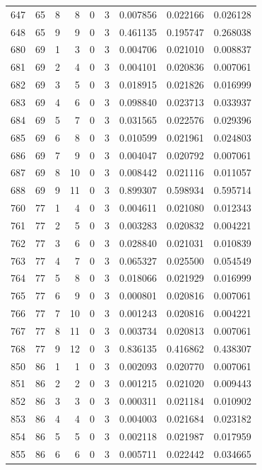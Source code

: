 \begin{longtable}{rrrrrrrrr}
647 & 65 & 8 & 8 & 0 & 3 & 0.007856 & 0.022166 & 0.026128 \\
648 & 65 & 9 & 9 & 0 & 3 & 0.461135 & 0.195747 & 0.268038 \\
680 & 69 & 1 & 3 & 0 & 3 & 0.004706 & 0.021010 & 0.008837 \\
681 & 69 & 2 & 4 & 0 & 3 & 0.004101 & 0.020836 & 0.007061 \\
682 & 69 & 3 & 5 & 0 & 3 & 0.018915 & 0.021826 & 0.016999 \\
683 & 69 & 4 & 6 & 0 & 3 & 0.098840 & 0.023713 & 0.033937 \\
684 & 69 & 5 & 7 & 0 & 3 & 0.031565 & 0.022576 & 0.029396 \\
685 & 69 & 6 & 8 & 0 & 3 & 0.010599 & 0.021961 & 0.024803 \\
686 & 69 & 7 & 9 & 0 & 3 & 0.004047 & 0.020792 & 0.007061 \\
687 & 69 & 8 & 10 & 0 & 3 & 0.008442 & 0.021116 & 0.011057 \\
688 & 69 & 9 & 11 & 0 & 3 & 0.899307 & 0.598934 & 0.595714 \\
760 & 77 & 1 & 4 & 0 & 3 & 0.004611 & 0.021080 & 0.012343 \\
761 & 77 & 2 & 5 & 0 & 3 & 0.003283 & 0.020832 & 0.004221 \\
762 & 77 & 3 & 6 & 0 & 3 & 0.028840 & 0.021031 & 0.010839 \\
763 & 77 & 4 & 7 & 0 & 3 & 0.065327 & 0.025500 & 0.054549 \\
764 & 77 & 5 & 8 & 0 & 3 & 0.018066 & 0.021929 & 0.016999 \\
765 & 77 & 6 & 9 & 0 & 3 & 0.000801 & 0.020816 & 0.007061 \\
766 & 77 & 7 & 10 & 0 & 3 & 0.001243 & 0.020816 & 0.004221 \\
767 & 77 & 8 & 11 & 0 & 3 & 0.003734 & 0.020813 & 0.007061 \\
768 & 77 & 9 & 12 & 0 & 3 & 0.836135 & 0.416862 & 0.438307 \\
850 & 86 & 1 & 1 & 0 & 3 & 0.002093 & 0.020770 & 0.007061 \\
851 & 86 & 2 & 2 & 0 & 3 & 0.001215 & 0.021020 & 0.009443 \\
852 & 86 & 3 & 3 & 0 & 3 & 0.000311 & 0.021184 & 0.010902 \\
853 & 86 & 4 & 4 & 0 & 3 & 0.004003 & 0.021684 & 0.023182 \\
854 & 86 & 5 & 5 & 0 & 3 & 0.002118 & 0.021987 & 0.017959 \\
855 & 86 & 6 & 6 & 0 & 3 & 0.005711 & 0.022442 & 0.034665 \\

\end{longtable}
